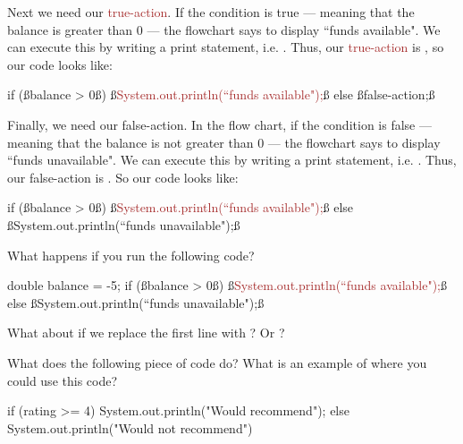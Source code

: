 \begin{example}
Next we need our \textcolor{Brown}{true-action}. If the \textcolor{mygreen}{condition} is true --- meaning that the balance is greater than 0 --- the flowchart says to display ``funds available". We can execute this by writing a print statement, i.e. . Thus, our \textcolor{Brown}{true-action} is , so our code looks like:

\begin{code}
if (ß\textcolor{mygreen}{balance > 0}ß) 
{
    ß\textcolor{Brown}{System.out.println(``funds available");}ß
}
else
{
    ß\textcolor{Rhodamine}{false-action;}ß
}
\end{code}

Finally, we need our \textcolor{Rhodamine}{false-action}. In the flow chart, if the \textcolor{mygreen}{condition} is false --- meaning that the balance is not greater than 0 --- the flowchart says to display ``funds unavailable".  We can execute this by writing a print statement, i.e. . Thus, our \textcolor{Rhodamine}{false-action} is . So our code looks like:

\begin{code}
if (ß\textcolor{mygreen}{balance > 0}ß) 
{
    ß\textcolor{Brown}{System.out.println(``funds available");}ß
}
else
{
    ß\textcolor{Rhodamine}{System.out.println(``funds unavailable");}ß
}
\end{code}

\end{example}

\begin{exercise}
What happens if you run the following code?

\begin{code}
double balance = -5;
if (ß\textcolor{mygreen}{balance > 0}ß) 
{
    ß\textcolor{Brown}{System.out.println(``funds available");}ß
}
else
{
    ß\textcolor{Rhodamine}{System.out.println(``funds unavailable");}ß
}
\end{code}

What about if we replace the first line with ? Or ?
\end{exercise}

\begin{exercise}
What does the following piece of code do? What is an example of where you could use this code?

\begin{code}
if (rating >= 4) {
    System.out.println("Would recommend");
} else {
    System.out.println("Would not recommend")
}
\end{code}

\end{exercise}

